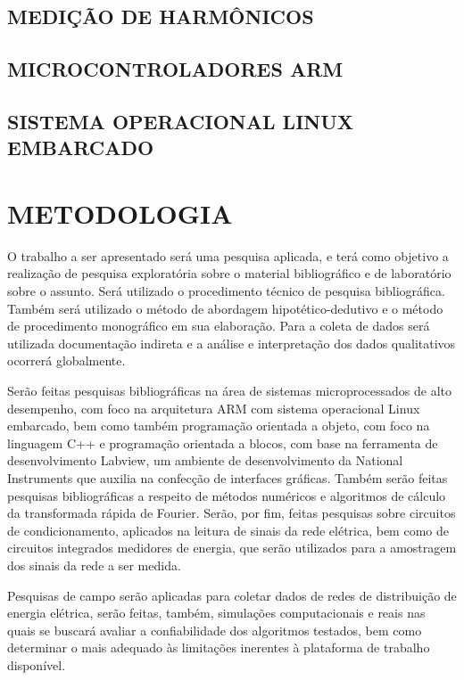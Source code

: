 \documentclass[
	12pt,				%
	openright,			%
	oneside,			%
	a4paper,			%
	chapter=TITLE,		%
	english,			%
	french,				%
	spanish,			%
	brazil,				%
	article,			%
	]{uea-abntex2}
\begin{document}
\subsection{MEDIÇÃO DE HARMÔNICOS}

\subsection{MICROCONTROLADORES ARM}

\subsection{SISTEMA OPERACIONAL LINUX EMBARCADO}

\section{METODOLOGIA}

\hspace*{0.8cm}O trabalho a ser apresentado será uma pesquisa aplicada, e terá como objetivo a realização de pesquisa exploratória sobre o material bibliográfico e de laboratório sobre o assunto. Será utilizado o procedimento técnico de pesquisa bibliográfica. Também será utilizado o método de abordagem hipotético-dedutivo e o método de procedimento monográfico em sua elaboração. Para a coleta de dados será utilizada documentação indireta e a análise e interpretação dos dados qualitativos ocorrerá globalmente.

Serão feitas pesquisas bibliográficas na área de sistemas microprocessados de alto desempenho, com foco na arquitetura ARM com sistema operacional Linux embarcado, bem como também programação orientada a objeto, com foco na linguagem C++ e programação orientada a blocos, com base na ferramenta de desenvolvimento Labview, um ambiente de desenvolvimento da National Instruments que auxilia na confecção de interfaces gráficas. Também serão feitas pesquisas bibliográficas a respeito de métodos numéricos e algoritmos de cálculo da transformada rápida de Fourier. Serão, por fim, feitas pesquisas sobre circuitos de condicionamento, aplicados na leitura de sinais da rede elétrica, bem como de circuitos integrados medidores de energia, que serão utilizados para a amostragem dos sinais da rede a ser medida.

Pesquisas de campo serão aplicadas para coletar dados de redes de distribuição de energia elétrica, serão feitas, também, simulações computacionais e reais nas quais se buscará avaliar a confiabilidade dos algoritmos testados, bem como determinar o mais adequado às limitações inerentes à plataforma de trabalho disponível.
\end{document}
